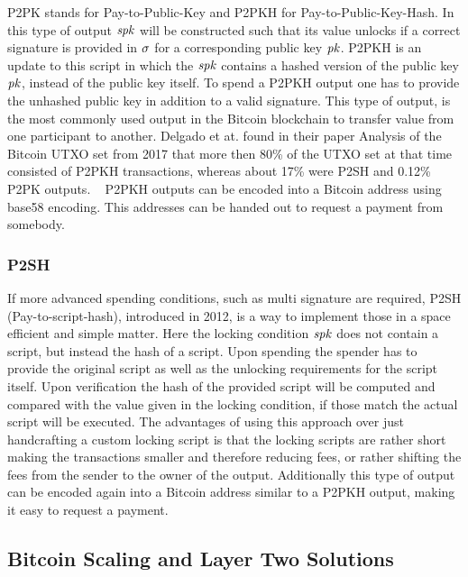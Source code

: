 P2PK stands for Pay-to-Public-Key and P2PKH for Pay-to-Public-Key-Hash.
In this type of output $\mathit{spk}$ will be constructed such that its value unlocks if a correct signature is
provided in $\mathit{\sigma}$ for a corresponding public key $\mathit{pk}$.
P2PKH is an update to this script in which the $\mathit{spk}$ contains a hashed version of the public key $\mathit{pk}$,
instead of the public key itself.
To spend a P2PKH output one has to provide the unhashed public key in addition to a valid signature.
This type of output, is the most commonly used output in the Bitcoin blockchain to transfer value from one participant to another.
Delgado et at. found in their paper Analysis of the Bitcoin UTXO set from 2017 that more then 80\% of the UTXO set at
that time consisted of P2PKH transactions, whereas about 17\% were P2SH and 0.12\% P2PK outputs.
~\cite{delgado2018analysis}
P2PKH outputs can be encoded into a Bitcoin address using base58 encoding.
This addresses can be handed out to request a payment from somebody.

\subsubsection{P2SH\label{subsubsec:p2sh}}

If more advanced spending conditions, such as multi signature are required, P2SH (Pay-to-script-hash), introduced in
2012, is a way to implement those in a space efficient and simple matter.
Here the locking condition $\mathit{spk}$ does not contain a script, but instead the hash of a script.
Upon spending the spender has to provide the original script as well as the unlocking requirements for the script
itself.
Upon verification the hash of the provided script will be computed and compared with the value given in the locking
condition, if those match the actual script will be executed.
The advantages of using this approach over just handcrafting a custom locking script is that the locking scripts are
rather short making the transactions smaller and therefore reducing fees, or rather shifting the fees from the sender
to the owner of the output.
Additionally this type of output can be encoded again into a Bitcoin address similar to a P2PKH output, making it
easy to request a payment.

\subsection{Bitcoin Scaling and Layer Two Solutions}\label{sec:bitcoinScaling}


